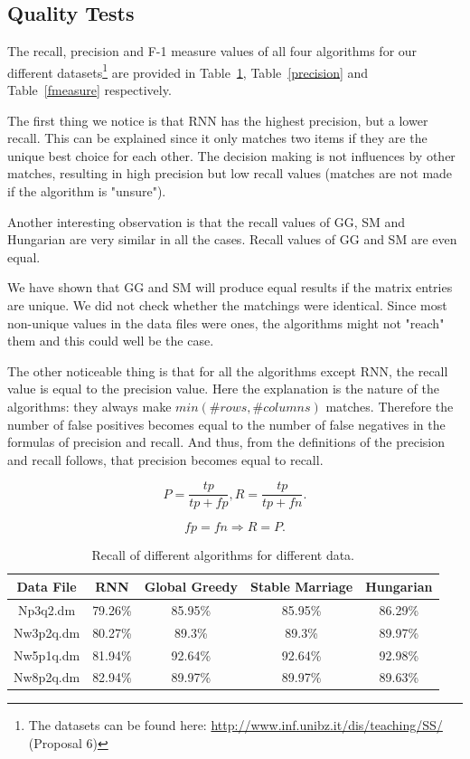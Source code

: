 \documentclass[a4paper,11pt]{article}
\begin{document}
\subsection{Quality Tests}

The recall, precision and F-1 measure values of all four algorithms for our different datasets\footnote{The datasets can be found here: \url{http://www.inf.unibz.it/dis/teaching/SS/} (Proposal 6)} are provided in Table~\ref{recall}, Table~\ref{precision} and Table~\ref{fmeasure} respectively. 

The first thing we notice is that RNN has the highest precision, but a lower recall. This can be explained since it only matches two items if they are the unique best choice for each other. The decision making is not influences by other matches, resulting in high precision but low recall values (matches are not made if the algorithm is "unsure").

Another interesting observation is that the recall values of GG, SM and Hungarian are very similar in all the cases. Recall values of GG and SM are even equal. %

We have shown that GG and SM will produce equal results if the matrix entries are unique. We did not check whether the matchings were identical. Since most non-unique values in the data files were ones, the algorithms might not "reach" them and this could well be the case.

The other noticeable thing is that for all the algorithms except RNN, the recall value is equal to the precision value. Here the explanation is the nature of the algorithms: they always make $min(\#rows, \#columns)$ matches. Therefore the number of false positives becomes equal to the number of false negatives in the formulas of precision and recall. And thus, from the definitions of the precision and recall follows, that precision becomes equal to recall.


\[P = \frac{tp}{tp+fp}, R = \frac{tp}{tp+fn}.\]

\[fp=fn \Rightarrow R=P.\]

\begin{table}[tbh]
\centering
\begin{tabular}{|c|c|c|c|c|}
\hline 
Data File & RNN & Global Greedy & Stable Marriage & Hungarian \tabularnewline
\hline 
\hline 
 Np3q2.dm & 79.26\% & 85.95\% & 85.95\% & 86.29\%\tabularnewline
\hline
 Nw3p2q.dm & 80.27\% & 89.3\% & 89.3\% & 89.97\%\tabularnewline
\hline 
 Nw5p1q.dm & 81.94\% & 92.64\% & 92.64\% & 92.98\%\tabularnewline
\hline 
 Nw8p2q.dm & 82.94\% & 89.97\% & 89.97\% & 89.63\%\tabularnewline
\hline
\end{tabular}
\caption{Recall of different algorithms for different data.}
\label{recall}
\end{table}
\end{document}

